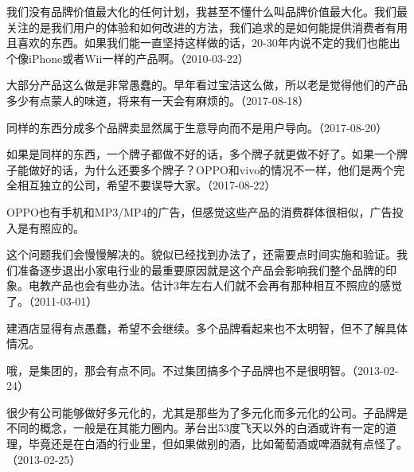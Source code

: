 
我们没有品牌价值最大化的任何计划，我甚至不懂什么叫品牌价值最大化。我们最关注的是我们用户的体验和如何改进的方法，我们追求的是如何能提供消费者有用且喜欢的东西。如果我们能一直坚持这样做的话，20-30年内说不定的我们也能出个像iPhone或者Wii一样的产品啊。（2010-03-22）


大部分产品这么做是非常愚蠢的。早年看过宝洁这么做，所以老是觉得他们的产品多少有点蒙人的味道，将来有一天会有麻烦的。（2017-08-18）


同样的东西分成多个品牌卖显然属于生意导向而不是用户导向。（2017-08-20）


如果是同样的东西，一个牌子都做不好的话，多个牌子就更做不好了。如果一个牌子能做好的话，为什么还要多个牌子？OPPO和vivo的情况不一样，他们是两个完全相互独立的公司，希望不要误导大家。（2017-08-22）


OPPO也有手机和MP3/MP4的广告，但感觉这些产品的消费群体很相似，广告投入是有照应的。

这个问题我们会慢慢解决的。貌似已经找到办法了，还需要点时间实施和验证。我们准备逐步退出小家电行业的最重要原因就是这个产品会影响我们整个品牌的印象。电教产品也会有些办法。估计3年左右人们就不会再有那种相互不照应的感觉了。（2011-03-01）


建酒店显得有点愚蠢，希望不会继续。多个品牌看起来也不太明智，但不了解具体情况。


哦，是集团的，那会有点不同。不过集团搞多个子品牌也不是很明智。（2013-02-24）


很少有公司能够做好多元化的，尤其是那些为了多元化而多元化的公司。子品牌是不同的概念，一般是在其能力圈内。茅台出53度飞天以外的白酒或许有一定的道理，毕竟还是在白酒的行业里，但如果做别的酒，比如葡萄酒或啤酒就有点怪了。（2013-02-25）

